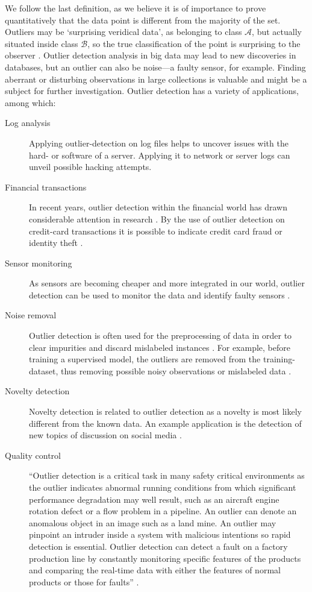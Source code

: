 We follow the last definition, as we believe it is of importance to prove quantitatively that the data point is different from the majority of the set. Outliers may be `surprising veridical data', as belonging to class $\mathcal{A}$, but actually situated inside class $\mathcal{B}$, so the true classification of the point is surprising to the observer \cite{John95robustdecision}. Outlier detection analysis in big data may lead to new discoveries in databases, but an outlier can also be noise---a faulty sensor, for example. Finding aberrant or disturbing observations in large collections is valuable and might be a subject for further investigation. Outlier detection has a variety of applications, among which:

\begin{description}
  \item[Log analysis] Applying outlier-detection on log files helps to uncover issues with the hard- or software of a server. Applying it to network or server logs can unveil possible hacking attempts. 
  \item[Financial transactions] In recent years, outlier detection within the financial world has drawn considerable attention in research \cite{Kanhere2014}. By the use of outlier detection on credit-card transactions it is possible to indicate credit card fraud or identity theft \cite{618940}.
  \item[Sensor monitoring] As sensors are becoming cheaper and more integrated in our world, outlier detection can be used to monitor the data and identify faulty sensors \cite{Fujimaki:2005:ASA:1081870.1081917}.
  \item[Noise removal] Outlier detection is often used for the preprocessing of data in order to clear impurities and discard mislabeled instances \cite{Brodley96identifyingand}. For example, before training a supervised model, the outliers are removed from the training-dataset, thus removing possible noisy observations or mislabeled data \cite{63857}.
  \item[Novelty detection] Novelty detection is related to outlier detection as a novelty is most likely different from the known data. An example application is the detection of new topics of discussion on social media \cite{Markou20032481,Markou20032499,SPC3:SPC3353}.
  \item[Quality control] ``Outlier detection is a critical task in many safety critical environments as the outlier indicates abnormal running conditions from which significant performance degradation may well result, such as an aircraft engine rotation defect or a flow problem in a pipeline. An outlier can denote an anomalous object in an image such as a land mine. An outlier may pinpoint an intruder inside a system with malicious intentions so rapid detection is essential. Outlier detection can detect a fault on a factory production line by constantly monitoring specific features of the products and comparing the real-time data with either the features of normal products or those for faults'' \cite{6416666}.
\end{description}

